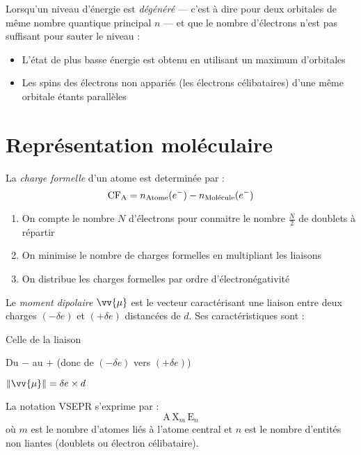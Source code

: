 \documentclass[11pt,a4paper,fleqn,pdftex]{report}
\begin{document}
\begin{itheorem}
  Lorsqu'un niveau d'énergie est \emph{dégénéré} --- c'est à dire pour deux orbitales de même nombre quantique principal $n$ --- et que le nombre d'électrons n'est pas suffisant pour sauter le niveau :
  \begin{itemize}
    \item L'état de plus basse énergie est obtenu en utilisant un maximum d'orbitales
    \item Les spins des électrons non appariés (les électrons célibataires) d'une même orbitale étants parallèles
  \end{itemize}
\end{itheorem}
\section{Représentation moléculaire} %
\label{sec:representation}
\begin{methode}
La \emph{charge formelle} d'un atome est determinée par : 
\begin{equation}
    \mathrm{CF}_{\ce{A}} = n_\text{Atome}(e^-) - n_\text{Molécule}(e^-)
\end{equation}
    \begin{enumerate}
      \item On compte le nombre $N$ d'électrons pour connaitre le nombre $\frac{N}{2}$ de doublets à répartir
      \item On minimise le nombre de charges formelles en multipliant les liaisons
      \item On distribue les charges formelles par ordre d'électronégativité
    \end{enumerate}
Le \emph{moment dipolaire} $\vv{\mu}$ est le vecteur caractérisant une liaison entre deux charges $(-\delta e)$ et $(+\delta e)$ distancées de $d$. Ses caractéristiques sont :
\begin{description}[noitemsep, topsep=4pt,parsep=0pt,partopsep=0pt,leftmargin=\parindent,labelindent=\parindent]
  \item[Direction] Celle de la liaison
  \item[Sens] Du $-$ au $+$ (donc de $(-\delta e)$ vers $(+\delta e)$)
  \item[Norme] $\| \vv{\mu} \| = \delta e \times d$
\end{description}
La notation VSEPR s'exprime par : 
\begin{equation}\tag{VSEPR}
\mathrm{A}\,\mathrm{X}_m\,\mathrm{E}_n
\end{equation}
où $m$ est le nombre d'atomes liés à l'atome central et $n$ est le nombre d'entités non liantes (doublets ou électron célibataire).
\end{methode}
\end{document}
